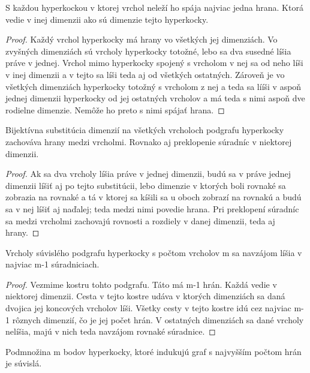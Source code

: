 \begin{veta}
S každou hyperkockou v ktorej vrchol neleží ho spája najviac jedna hrana.
Ktorá vedie v inej dimenzii ako sú dimenzie tejto hyperkocky.
\end{veta}
\begin{proof}
Každý vrchol hyperkocky má hrany vo všetkých jej dimenziách. Vo zvyšných
dimenziách sú vrcholy hyperkocky totožné, lebo sa dva susedné líšia práve v
jednej. Vrchol mimo hyperkocky spojený s vrcholom v nej sa od neho líši v
inej dimenzii a v tejto sa líši teda aj od všetkých ostatných. Zároveň je vo
všetkých dimenziách hyperkocky totožný s vrcholom z nej a teda sa lííši v
aspoň jednej dimenzii hyperkocky od jej ostatných vrcholov a má teda s nimi
aspoň dve rodielne dimenzie. Nemôže ho preto s nimi spájať hrana.
\end{proof}

\begin{veta}
Bijektívna substitúcia dimenzií na všetkých vrcholoch podgrafu hyperkocky 
zachováva
hrany medzi vrcholmi. Rovnako aj preklopenie súradníc v niektorej dimenzii.
\end{veta}
\begin{proof}
Ak sa dva vrcholy líšia práve v jednej dimenzii, budú sa v práve jednej
dimenzii líšiť aj po tejto substitúcii, lebo dimenzie v ktorých boli rovnaké
sa zobrazia na rovnaké a tá v ktorej sa kíšili sa u oboch zobrazí na rovnakú
a budú sa v nej líšiť aj naďalej; teda medzi nimi povedie hrana.
Pri preklopení súradníc sa medzi vrcholmi zachovajú rovnosti a rozdiely v
danej dimenzii, teda aj hrany.
\end{proof}

\begin{veta}
Vrcholy súvislého podgrafu hyperkocky s počtom vrcholov m sa navzájom líšia
v najviac m-1 súradniciach.
\end{veta}

\begin{proof}
Vezmime kostru tohto podgrafu. Táto má m-1 hrán. Každá vedie v niektorej
dimenzii. Cesta v tejto kostre udáva v ktorých dimenziách sa daná dvojica
jej koncových vrcholov líši. Všetky cesty v tejto kostre idú cez najviac m-1
rôznych dimenzií, čo je jej počet hrán. V ostatných dimenziách sa dané
vrcholy nelíšia, majú v nich teda navzájom rovnaké súradnice.
\end{proof}

\begin{veta}
Podmnožina m bodov hyperkocky, ktoré indukujú graf s najvyšším počtom hrán je
súvislá.
\end{veta}

